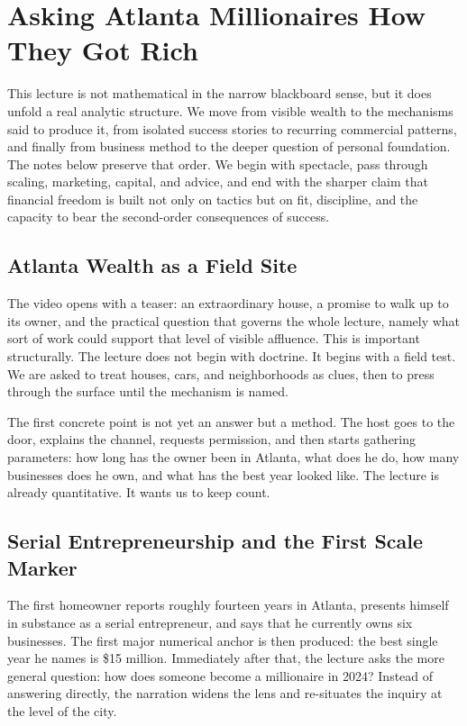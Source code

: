 \chapter{Asking Atlanta Millionaires How They Got Rich}

This lecture is not mathematical in the narrow blackboard sense, but it does unfold a real analytic structure. We move from visible wealth to the mechanisms said to produce it, from isolated success stories to recurring commercial patterns, and finally from business method to the deeper question of personal foundation. The notes below preserve that order. We begin with spectacle, pass through scaling, marketing, capital, and advice, and end with the sharper claim that financial freedom is built not only on tactics but on fit, discipline, and the capacity to bear the second-order consequences of success.

\section{Atlanta Wealth as a Field Site}

The video opens with a teaser: an extraordinary house, a promise to walk up to its owner, and the practical question that governs the whole lecture, namely what sort of work could support that level of visible affluence. This is important structurally. The lecture does not begin with doctrine. It begins with a field test. We are asked to treat houses, cars, and neighborhoods as clues, then to press through the surface until the mechanism is named.

The first concrete point is not yet an answer but a method. The host goes to the door, explains the channel, requests permission, and then starts gathering parameters: how long has the owner been in Atlanta, what does he do, how many businesses does he own, and what has the best year looked like. The lecture is already quantitative. It wants us to keep count.

\section{Serial Entrepreneurship and the First Scale Marker}

The first homeowner reports roughly fourteen years in Atlanta, presents himself in substance as a serial entrepreneur, and says that he currently owns six businesses. The first major numerical anchor is then produced: the best single year he names is \$15 million. Immediately after that, the lecture asks the more general question: how does someone become a millionaire in 2024? Instead of answering directly, the narration widens the lens and re-situates the inquiry at the level of the city.

